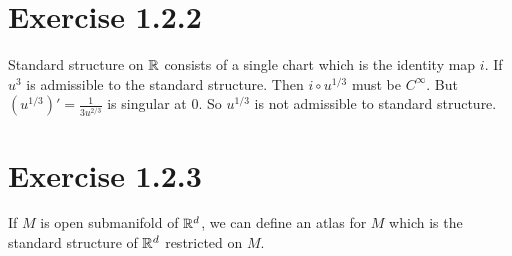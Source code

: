 \documentclass[12pt]{article}
\begin{document}
\section*{Exercise 1.2.2}
Standard structure on $\mathbb{R}$ consists of a single chart which is the identity map $i$. If $u^3$ is admissible to the standard structure. Then $i \circ u^{1/3}$ must be $C^\infty$. But $(u^{1/3})' = \frac{1}{3u^{2/3}}$ is singular at 0. So $u^{1/3}$ is not admissible to standard structure.

\section*{Exercise 1.2.3}
If $M$ is open submanifold of $\mathbb{R}^d$, we can define an atlas for $M$ which is the standard structure of $\mathbb{R}^d$ restricted on $M$.
	
\end{document}

